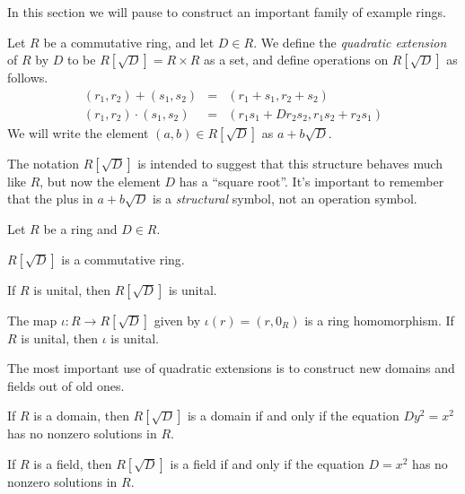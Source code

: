 In this section we will pause to construct an important family of example rings.

\begin{dfn}
Let \(R\) be a commutative ring, and let \(D \in R\).
We define the \emph{quadratic extension} of \(R\) by \(D\) to be \(R[\sqrt{D}] = R \times R\) as a set, and define operations on \(R[\sqrt{D}]\) as follows.
\begin{eqnarray*}
(r_1,r_2) + (s_1,s_2) & = & (r_1+s_1, r_2+s_2) \\
(r_1,r_2) \cdot (s_1,s_2) & = & (r_1s_1 + Dr_2s_2, r_1s_2 + r_2s_1)
\end{eqnarray*}
We will write the element \((a,b) \in R[\sqrt{D}]\) as \(a + b\sqrt{D}\).
\end{dfn}

The notation \(R[\sqrt{D}]\) is intended to suggest that this structure behaves much like \(R\), but now the element \(D\) has a ``square root''.
It's important to remember that the plus in \(a + b\sqrt{D}\) is a \emph{structural} symbol, not an operation symbol.

\begin{prop} \label{prop:quad-ext-ring}
Let \(R\) be a ring and \(D \in R\).
\begin{proplist*}
\item \(R[\sqrt{D}]\) is a commutative ring.
\item If \(R\) is unital, then \(R[\sqrt{D}]\) is unital.
\item The map \(\iota : R \rightarrow R[\sqrt{D}]\) given by \(\iota(r) = (r,0_R)\) is a ring homomorphism.
If \(R\) is unital, then \(\iota\) is unital.
\end{proplist*}
\end{prop}

The most important use of quadratic extensions is to construct new domains and fields out of old ones.

\begin{prop} \label{prop:quad-ext-dom} \mbox{}
\begin{proplist}
\item If \(R\) is a domain, then \(R[\sqrt{D}]\) is a domain if and only if the equation \(Dy^2 = x^2\) has no nonzero solutions in \(R\).
\item If \(R\) is a field, then \(R[\sqrt{D}]\) is a field if and only if the equation \(D = x^2\) has no nonzero solutions in \(R\).
\end{proplist}
\end{prop}

